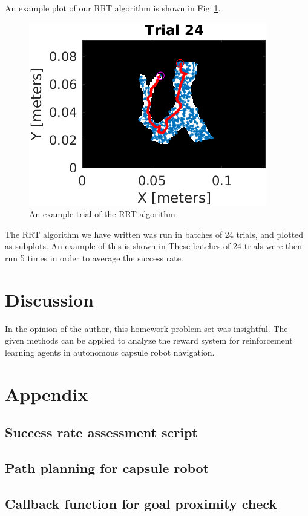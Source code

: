 \documentclass[conference]{IEEEtran}
\begin{document}
An example plot of our RRT algorithm is shown in Fig~\ref{trial24-fig}.

\begin{figure}[h]
    \centering
    \includegraphics[scale=0.85]{trial24.png}
    \caption{An example trial of the RRT algorithm}
    \label{trial24-fig}
\end{figure}

The RRT algorithm we have written was run in batches of 24 trials, and plotted as subplots.
An example of this is shown in 
These batches of 24 trials were then run 5 times in order to average the success rate. 


\section{Discussion}
In the opinion of the author, this homework problem set was insightful. The given methods
can be applied to analyze the reward system for reinforcement learning agents in autonomous
capsule robot navigation.

\section{Appendix}

\subsection{Success rate assessment script}



\subsection{Path planning for capsule robot}



\subsection{Callback function for goal proximity check}





\end{document}
